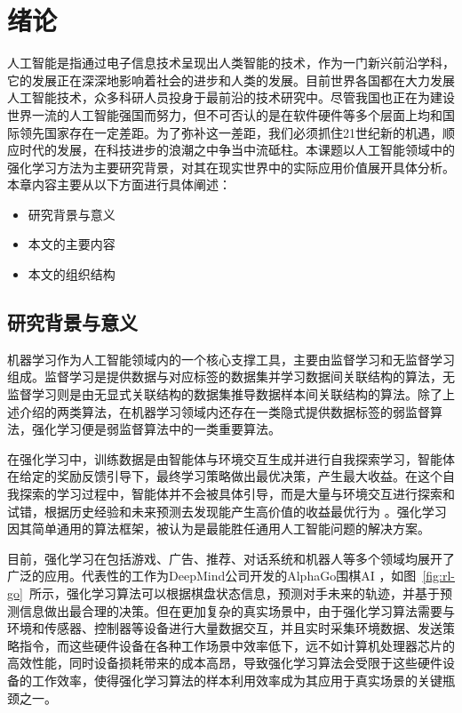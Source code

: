 
\chapter{绪论}\label{chap:intro}

人工智能是指通过电子信息技术呈现出人类智能的技术，作为一门新兴前沿学科，它的发展正在深深地影响着社会的进步和人类的发展。目前世界各国都在大力发展人工智能技术，众多科研人员投身于最前沿的技术研究中。尽管我国也正在为建设世界一流的人工智能强国而努力，但不可否认的是在软件硬件等多个层面上均和国际领先国家存在一定差距。为了弥补这一差距，我们必须抓住21世纪新的机遇，顺应时代的发展，在科技进步的浪潮之中争当中流砥柱。本课题以人工智能领域中的强化学习方法为主要研究背景，对其在现实世界中的实际应用价值展开具体分析。本章内容主要从以下方面进行具体阐述：

\begin{itemize}
    \item 研究背景与意义
    \item 本文的主要内容
    \item 本文的组织结构
\end{itemize}

\section{研究背景与意义}

机器学习作为人工智能领域内的一个核心支撑工具，主要由监督学习和无监督学习组成\cite{sathya2013comparison,goodfellow2016deep}。监督学习是提供数据与对应标签的数据集并学习数据间关联结构的算法，无监督学习则是由无显式关联结构的数据集推导数据样本间关联结构的算法\cite{bishop2006pattern}。除了上述介绍的两类算法，在机器学习领域内还存在一类隐式提供数据标签的弱监督算法\cite{zhou2018brief}，强化学习便是弱监督算法中的一类重要算法。

在强化学习中，训练数据是由智能体与环境交互生成并进行自我探索学习，智能体在给定的奖励反馈引导下，最终学习策略做出最优决策，产生最大收益\cite{tan1993multi}。在这个自我探索的学习过程中，智能体并不会被具体引导，而是大量与环境交互进行探索和试错，根据历史经验和未来预测去发现能产生高价值的收益最优行为 \cite{kaelbling1996reinforcement,sutton2018reinforcement}。强化学习因其简单通用的算法框架，被认为是最能胜任通用人工智能问题的解决方案\cite{shoham2003multi}。 

目前，强化学习在包括游戏、广告、推荐、对话系统和机器人等多个领域均展开了广泛的应用\cite{cai2017real,wang2018reinforcement,li2016deep,riedmiller2009reinforcement}。代表性的工作为DeepMind公司开发的AlphaGo围棋AI \cite{chen2016evolution}，如图~\ref{fig:rl-go}~所示，强化学习算法可以根据棋盘状态信息，预测对手未来的轨迹，并基于预测信息做出最合理的决策\cite{holcomb2018overview}。但在更加复杂的真实场景中，由于强化学习算法需要与环境和传感器、控制器等设备进行大量数据交互，并且实时采集环境数据、发送策略指令，而这些硬件设备在各种工作场景中效率低下，远不如计算机处理器芯片的高效性能，同时设备损耗带来的成本高昂，导致强化学习算法会受限于这些硬件设备的工作效率\cite{zhang2021robust,yao2021sample}，使得强化学习算法的样本利用效率成为其应用于真实场景的关键瓶颈之一\cite{arulkumaran2017deep,kober2013reinforcement}。

